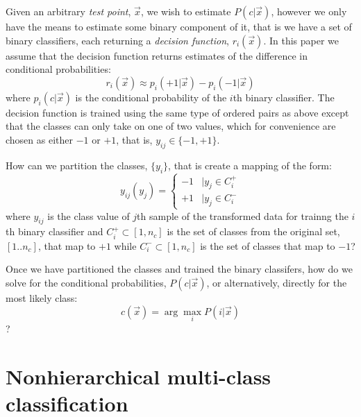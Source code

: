\documentclass{article}
\begin{document}
Given an arbitrary {\it test point}, $\vec x$, 
we wish to estimate $P(c | \vec x)$, however we only have
the means to estimate some binary component of it, that is we have a 
set of binary classifiers, 
each returning a {\it decision function}, $r_i(\vec x)$.
In this paper we assume that the decision function 
returns estimates of the difference in conditional probabilities:
\begin{equation}
	r_i(\vec x) \approx p_i(+1|\vec x) - p_i(-1|\vec x)
\end{equation}
where $p_i(c|\vec x)$ is the conditional probability of the $i$th
binary classifier.
The decision function is trained using the same type of ordered pairs as
above except that the classes can only take on one of two values,
which for convenience are chosen as either $-1$ or $+1$, 
that is, $y_{ij} \in \lbrace -1, +1 \rbrace$.

How can we partition the classes, $\lbrace y_i \rbrace$, that is create
a mapping of the form:
\begin{equation}
	y_{ij} (y_j) = \left \lbrace  \begin{array}{lr}
-1 & | y_j \in C_i^+ \\
+1 & | y_j \in C_i^-
\end{array}
\right .
\end{equation}
where $y_{ij}$ is the class value of $j$th sample of the transformed data 
for trainng the $i$th binary classifier and 
$C_i^+ \subset [1,n_c]$ is the set of classes from the original set, 
$[1..n_c]$, that map to $+1$ while
$C_i^- \subset [1,n_c]$ is the set of classes that map to $-1$?

Once we have partitioned the classes
and trained the binary classifers,
how do we solve for the conditional probabilities, $P(c|\vec x)$,
or alternatively, directly for the most likely class:
\begin{equation}
	c(\vec x)=\arg \max_i P(i | \vec x)
\end{equation}
?


\section{Nonhierarchical multi-class classification}
\end{document}
